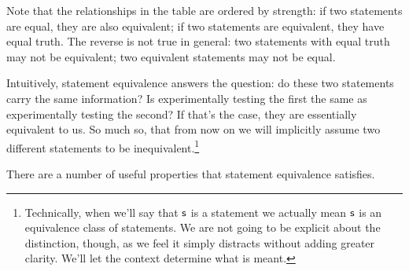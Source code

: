 	Note that the relationships in the table are ordered by strength: if two statements are equal, they are also equivalent; if two statements are equivalent, they have equal truth. The reverse is not true in general: two statements with equal truth may not be equivalent; two equivalent statements may not be equal.
	
	Intuitively, statement equivalence answers the question: do these two statements carry the same information? Is experimentally testing the first the same as experimentally testing the second? If that's the case, they are essentially equivalent to us. So much so, that from now on we will implicitly assume two different statements to be inequivalent.\footnote{Technically, when we'll say that $\mathsf{s}$ is a statement we actually mean $\mathsf{s}$ is an equivalence class of statements. We are not going to be explicit about the distinction, though, as we feel it simply distracts without adding greater clarity. We'll let the context determine what is meant.}
	
	There are a number of useful properties that statement equivalence satisfies.
	
